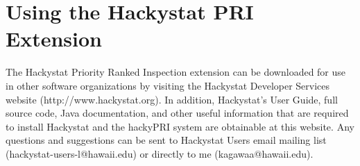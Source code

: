 \section{Using the Hackystat PRI Extension}
\label{section:using}
The Hackystat Priority Ranked Inspection extension can be downloaded for
use in other software organizations by visiting the Hackystat Developer
Services website (http://www.hackystat.org). In addition, Hackystat's User
Guide, full source code, Java documentation, and other useful information
that are required to install Hackystat and the hackyPRI system are
obtainable at this website.  Any questions and suggestions can be sent to
Hackystat Users email mailing list (hackystat-users-l@hawaii.edu) or
directly to me (kagawaa@hawaii.edu).



















